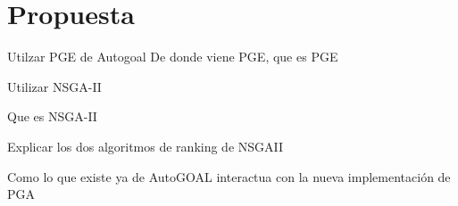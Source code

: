 \chapter{Propuesta}\label{chapter:proposal}
Utilzar PGE de Autogoal
De donde viene PGE, que es PGE

Utilizar NSGA-II

Que es NSGA-II

Explicar los dos algoritmos de ranking de NSGAII

Como lo que existe ya de AutoGOAL interactua con la nueva implementaci\'on de PGA
